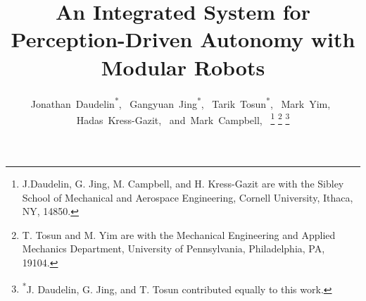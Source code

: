 \documentclass[journal]{IEEEtran}
\begin{document}
\title{An Integrated System for Perception-Driven Autonomy with Modular Robots}
\author{Jonathan~Daudelin\textsuperscript{*},~
        Gangyuan~Jing\textsuperscript{*},~
        Tarik~Tosun\textsuperscript{*},~
        Mark~Yim,~
        Hadas~Kress-Gazit,~
        and~Mark~Campbell,~%
\thanks{J.Daudelin, G. Jing, M. Campbell, and H. Kress-Gazit are with the Sibley School of Mechanical and Aerospace Engineering, Cornell University, Ithaca,
NY, 14850.}%
\thanks{T. Tosun and M. Yim are with the Mechanical Engineering and Applied Mechanics Department, University of Pennsylvania, Philadelphia, PA, 19104.}%
\thanks{\textsuperscript{*}J. Daudelin, G. Jing, and T. Tosun contributed equally to this work.}}


\maketitle
\end{document}
